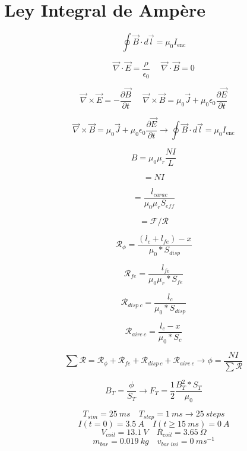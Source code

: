 \documentclass{article}
\begin{document}
\section*{Ley Integral de Ampère}

\huge
\[\oint \vec{B} \cdot d\vec{l} = \mu_0 I_{\text{enc}}\]

\[\vec{\nabla}\cdot \vec{E} = \frac{\rho}{\epsilon_0}~~~~~~\vec{\nabla}\cdot \vec{B} = 0\]

\[\vec{\nabla}\times\vec{E} = -\frac{\partial\vec{B}}{\partial t}~~~~~~\vec{\nabla}\times \vec{B} = \mu_0\vec{J}+\mu_0\epsilon_0\frac{\partial \vec{E}}{\partial t}\]


\[\vec{\nabla}\times \vec{B} = \mu_0\vec{J}+\mu_0\epsilon_0\frac{\partial \vec{E}}{\partial t} \rightarrow \oint \vec{B} \cdot d\vec{l} = \mu_0 I_{\text{enc}}\]


\[B = \mu_0\mu_r\frac{NI}{L}\]


\[=NI\]

\[=\frac{l_{carac}}{\mu_0\mu_r S_{eff}}\]

\[=\mathcal{F}/\mathcal{R}\]

\[\mathcal{R}_{\phi}=\frac{(l_c+l_{fe})-x}{\mu_0*S_{disp}}\]

\[\mathcal{R}_{fe}=\frac{l_{fe}}{\mu_0\mu_r*S_{fe}}\]

\[\mathcal{R}_{disp~c}=\frac{l_c}{\mu_0*S_{disp}}\]

\[\mathcal{R}_{aire~c}=\frac{l_c-x}{\mu_0*S_c}\]

\[\sum \mathcal{R}=\mathcal{R}_{\phi}+\mathcal{R}_{fe}+\mathcal{R}_{disp~c}+\mathcal{R}_{aire~c} \rightarrow \phi = \frac{NI}{\sum \mathcal{R}} \]

\[B_T=\frac{\phi}{S_T}\rightarrow F_T=\frac{1}{2}\frac{B_T^2*S_T}{\mu_0}\]

\[
T_{sim}=25~ms \quad T_{step}=1~ms \to 25~steps
\]
\[
I(t=0)=3.5~A \quad I(t\geq 15~ms)=0~A
\]
\[
V_{coil}=13.1~V \quad R_{coil}=3.65~\Omega
\]
\[
m_{bar}=0.019~kg \quad v_{bar~ini}=0~ms^{-1}
\]
\end{document}
